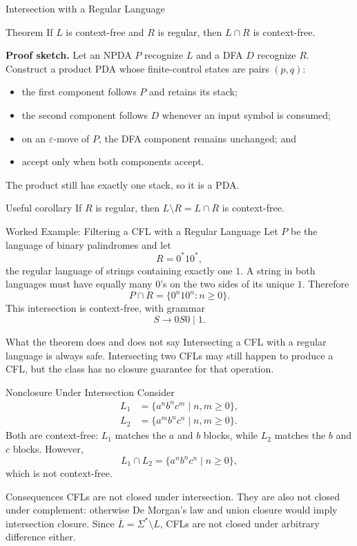 \documentclass[10pt]{beamer}
\begin{document}
\begin{frame}{Intersection with a Regular Language}
  \begin{block}{Theorem}
    If $L$ is context-free and $R$ is regular, then $L\cap R$ is context-free.
  \end{block}
  \pause
  \textbf{Proof sketch.} Let an NPDA $P$ recognize $L$ and a DFA $D$ recognize $R$.
  Construct a product PDA whose finite-control states are pairs $(p,q)$:
  \begin{itemize}
    \item the first component follows $P$ and retains its stack;
    \item the second component follows $D$ whenever an input symbol is consumed;
    \item on an $\varepsilon$-move of $P$, the DFA component remains unchanged; and
    \item accept only when both components accept.
  \end{itemize}
  The product still has exactly one stack, so it is a PDA.
  \begin{exampleblock}{Useful corollary}
    If $R$ is regular, then $L\setminus R=L\cap\overline R$ is context-free.
  \end{exampleblock}
\end{frame}

\begin{frame}{Worked Example: Filtering a CFL with a Regular Language}
  \small
  Let $P$ be the language of binary palindromes and let
  \[
    R=0^*10^*,
  \]
  the regular language of strings containing exactly one $1$.
  A string in both languages must have equally many $0$'s on the two sides of
  its unique $1$. Therefore
  \[
    P\cap R=\{0^n10^n:n\ge0\}.
  \]
  This intersection is context-free, with grammar
  \[
    S\to0S0\mid1.
  \]
  \begin{block}{What the theorem does and does not say}
    Intersecting a CFL with a regular language is always safe. Intersecting two
    CFLs may still happen to produce a CFL, but the class has no closure
    guarantee for that operation.
  \end{block}
\end{frame}

\begin{frame}{Nonclosure Under Intersection}
  Consider
  \begin{align*}
    L_1&=\{a^n b^n c^m\mid n,m\ge0\},\\
    L_2&=\{a^m b^n c^n\mid n,m\ge0\}.
  \end{align*}
  Both are context-free: $L_1$ matches the $a$ and $b$ blocks, while $L_2$ matches the $b$ and $c$ blocks.
  However,
  \[
    L_1\cap L_2=\{a^n b^n c^n\mid n\ge0\},
  \]
  which is not context-free.
  \pause
  \begin{alertblock}{Consequences}
    CFLs are not closed under intersection. They are also not closed under complement: otherwise
    De Morgan's law and union closure would imply intersection closure. Since
    $\overline L=\Sigma^*\setminus L$, CFLs are not closed under arbitrary difference either.
  \end{alertblock}
\end{frame}
\end{document}
